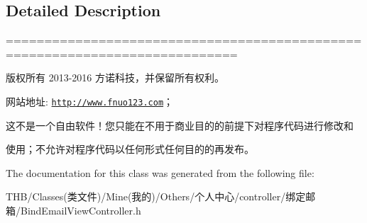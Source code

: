 \subsection{Detailed Description}
============================================================================

版权所有 2013-\/2016 方诺科技，并保留所有权利。

网站地址\+: \href{http://www.fnuo123.com}{\tt http\+://www.\+fnuo123.\+com}； 



这不是一个自由软件！您只能在不用于商业目的的前提下对程序代码进行修改和

使用；不允许对程序代码以任何形式任何目的的再发布。 

 

The documentation for this class was generated from the following file\+:\begin{DoxyCompactItemize}
\item 
T\+H\+B/\+Classes(类文件)/\+Mine(我的)/\+Others/个人中心/controller/绑定邮箱/Bind\+Email\+View\+Controller.\+h\end{DoxyCompactItemize}
